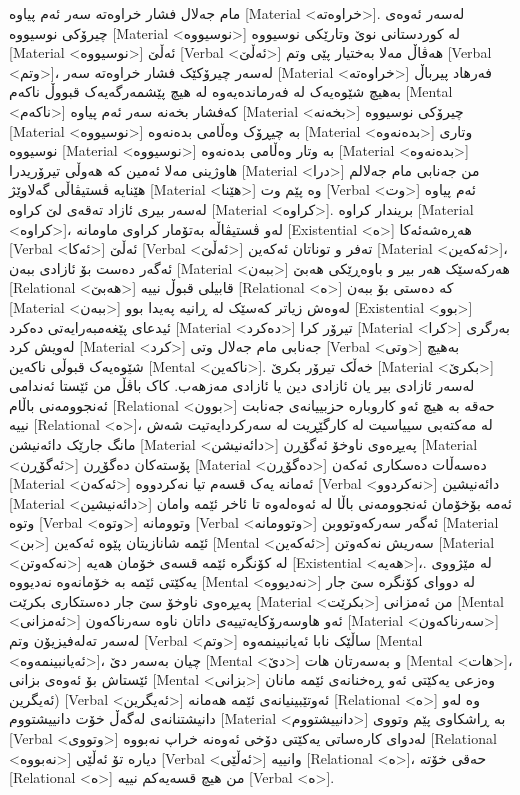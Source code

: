مام جەلال فشار خراوەتە سەر ئەم پیاوە [Material <خراوەتە>].
لەسەر ئەوەی چیرۆکی نوسیووە [Material <نوسیووە>] لە کوردستانی نوێ وتارێکی نوسیووە [Material <نوسیووە>] ئەڵێ [Verbal <ئەڵێ>] هەڤاڵ مەلا بەختیار پێی وتم [Verbal <وتم>]، لەسەر چیرۆکێک فشار خراوەتە سەر [Material <خراوەتە>] فەرهاد پیرباڵ بەهیچ شێوەیەک لە فەرماندەیەوە لە هیچ پێشمەرگەیەک قبووڵ ناکەم [Mental <ناکەم>] کەفشار بخەنە سەر ئەم پیاوە [Material <بخەنە>] چیرۆکی نوسیووە [Material <نوسیووە>] بە چیڕۆک وەڵامی بدەنەوه [Material <بدەنەوه>] وتاری نوسیووە [Material <نوسیووە>] بە وتار وەڵامی بدەنەوە [Material <بدەنەوە>] هاوژینی مەلا ئەمین کە هەوڵی تیرۆریدرا [Material <درا>] من جەنابی مام جەلالم هێنایە ڤستیڤاڵی گەلاوێژ [Material <هێنا>] وە پێم وت [Verbal <وت>] ئەم پیاوە لەسەر بیری ئازاد تەقەی لێ کراوە [Material <کراوە>].
بریندار کراوە [Material <کراوە>]، لەو ڤستیڤاڵە بەتۆمار کراوی ماومانە [Existential <ە>] هەڕەشەئەکا [Verbal <ئەکا>] ئەڵێ [Verbal <ئەڵێ>] تەفر و توناتان ئەکەین [Material <ئەکەین>]، ئەگەر دەست بۆ ئازادی ببەن [Material <ببەن>] هەرکەسێک هەر بیر و باوەڕێکی هەبێ [Relational <هەبێ>] قابیلی قبوڵ نییە [Relational <ە>] کە دەستی بۆ ببەن [Material <ببەن>] لەوەش زیاتر کەسێک لە ڕانیە پەیدا بوو [Existential <بوو>] ئیدعای پێغەمبەرایەتی دەکرد [Material <دەکرد>] تیرۆر کرا [Material <کرا>] بەرگری لەویش کرد [Material <کرد>] جەنابی مام جەلال وتی [Verbal <وتی>] بەهیچ شێوەیەک قبوڵی ناکەین [Mental <ناکەین>].
خەڵک تیرۆر بکرێ [Material <بکرێ>] لەسەر ئازادی بیر یان ئازادی دین یا ئازادی مەزهەب. کاک باڤڵ من ئێستا ئەندامی ئەنجوومەنی باڵام [Relational <بوون>] حەقە بە هیچ ئەو کاروبارە حزبییانەی جەنابت نییە [Relational <ە>]، لە مەکتەبی سییاسیت لە کارگێڕیت لە سەرکردایەتیت شەش مانگ جارێک دائەنیشن [Material <دائەنیشن>] پەیڕەوی ناوخۆ ئەگۆڕن [Material <ئەگۆڕن>] پۆستەکان دەگۆڕن [Material <دەگۆڕن>] دەسەڵات دەسکاری ئەکەن [Material <ئەکەن>] ئەمانە یەک قسەم تیا نەکردووە [Verbal <نەکردوو>] دائەنیشین [Material <دائەنیشین>] ئەمە بۆخۆمان ئەنجوومەنی باڵا لە ئەوەلەوە تا ئاخر ئێمە وامان وتوە [Verbal <وتوە>] وتوومانە [Verbal <وتوومانە>] ئەگەر سەرکەوتووبن [Material <بن>] ئێمه شانازیتان پێوە ئەکەین [Mental <ئەکەین>] سەریش نەکەوتن [Material <نەکەوتن>] لە کۆنگرە ئێمە قسەی خۆمان هەیە [Existential <هەیە>]،.
له مێژووی یەکێتی ئێمە بە خۆمانەوە نەدیووە [Mental <نەدیووە>] له دووای کۆنگرە سێ جار پەیڕەوی ناوخۆ سێ جار دەستکاری بکرێت [Material <بکرێت>] من ئەمزانی [Mental <ئەمزانی>] ئەو هاوسەرۆکایەتییەی داتان ناوە سەرناکەون [Material <سەرناکەون>] لەسەر تەلەفیزیۆن وتم [Verbal <وتم>] ساڵێک نابا ئەیانبینمەوە [Mental <ئەیانبینمەوە>]، چیان بەسەر دێ [Mental <دێ>] و بەسەرتان هات [Mental <هات>]، ئێستاش بۆ ئەوەی بزانی [Mental <بزانی>] وەزعی یەکێتی ئەو ڕەخنانەی ئێمە مانان ئەیگرین) [Verbal <ئەیگرین>] ئەوتێبینیانەی ئێمە هەمانە [Relational <ە>] وە لەو دانیشتنانەی لەگەڵ خۆت دانییشتووم [Material <دانییشتووم>] بە ڕاشکاوی پێم وتووی [Verbal <وتووی>] لەدوای کارەساتی یەکێتی دۆخی ئەوەنە خراپ نەبووە [Relational <نەبووە>] دیارە تۆ ئەڵێی [Verbal <ئەڵێی>] وانییە [Relational <ە>]، حەقی خۆتە [Relational <ە>] من هیچ قسەیەکم نییە [Verbal <ە>].
